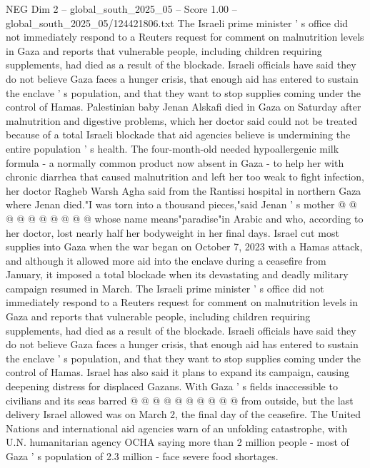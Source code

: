 \begin{textsample}{NEG Dim 2 – global\_south\_2025\_05 – Score 1.00 – global\_south\_2025\_05/124421806.txt}  \label{ex:f2_neg_149}
The Israeli prime minister ' s office did not immediately respond to a Reuters request for comment on malnutrition levels in Gaza and reports that vulnerable people, including children requiring supplements, had died as a result of the blockade.
Israeli officials have said they do not believe Gaza faces a hunger crisis, that enough aid has entered to sustain the enclave ' s population, and that they want to stop supplies coming under the control of Hamas.
Palestinian baby Jenan Alskafi died in Gaza on Saturday after malnutrition and digestive problems, which her doctor said could not be treated because of a total Israeli blockade that aid agencies believe is undermining the entire population ' s health.
The four-month-old needed hypoallergenic milk formula - a normally common product now absent in Gaza - to help her with chronic diarrhea that caused malnutrition and left her too weak to fight infection, her doctor Ragheb Warsh Agha said from the Rantissi hospital in northern Gaza where Jenan died."I was torn into a thousand pieces,"said Jenan ' s mother @ @ @ @ @ @ @ @ @ @ whose name means"paradise"in Arabic and who, according to her doctor, lost nearly half her bodyweight in her final days.
Israel cut most supplies into Gaza when the war began on October 7, 2023 with a Hamas attack, and although it allowed more aid into the enclave during a ceasefire from January, it imposed a total blockade when its devastating and deadly military campaign resumed in March.
The Israeli prime minister ' s office did not immediately respond to a Reuters request for comment on malnutrition levels in Gaza and reports that vulnerable people, including children requiring supplements, had died as a result of the blockade.
Israeli officials have said they do not believe Gaza faces a hunger crisis, that enough aid has entered to sustain the enclave ' s population, and that they want to stop supplies coming under the control of Hamas.
Israel has also said it plans to expand its campaign, causing deepening distress for displaced Gazans.
With Gaza ' s fields inaccessible to civilians and its seas barred @ @ @ @ @ @ @ @ @ @ from outside, but the last delivery Israel allowed was on March 2, the final day of the ceasefire.
The United Nations and international aid agencies warn of an unfolding catastrophe, with U.N. humanitarian agency OCHA saying more than 2 million people - most of Gaza ' s population of 2.3 million - face severe food shortages.

\end{textsample}
